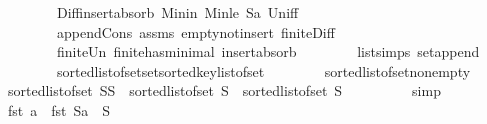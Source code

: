 \begin{isabellebody}
\ \ \ \ \ \ \ \ Diff{\isacharunderscore}{\kern0pt}insert{\isacharunderscore}{\kern0pt}absorb\ Min{\isacharunderscore}{\kern0pt}in\ Min{\isacharunderscore}{\kern0pt}le\ S{}a\ Un{\isacharunderscore}{\kern0pt}iff\isanewline
\ \ \ \ \ \ \ \ append{\isacharunderscore}{\kern0pt}Cons\ assms{\isacharparenleft}{\kern0pt}{}{\isacharparenright}{\kern0pt}\ empty{\isacharunderscore}{\kern0pt}not{\isacharunderscore}{\kern0pt}insert\ finite{\isacharunderscore}{\kern0pt}Diff\isanewline
\ \ \ \ \ \ \ \ finite{\isacharunderscore}{\kern0pt}Un\ finite{\isacharunderscore}{\kern0pt}has{\isacharunderscore}{\kern0pt}minimal\ insert{\isacharunderscore}{\kern0pt}absorb\isanewline
\ \ \ \ \ \ \ \ list{\isachardot}{\kern0pt}simps{\isacharparenleft}{\kern0pt}{}{}{\isacharparenright}{\kern0pt}\ set{\isacharunderscore}{\kern0pt}append\isanewline
\ \ \ \ \ \ \ \ sorted{\isacharunderscore}{\kern0pt}list{\isacharunderscore}{\kern0pt}of{\isacharunderscore}{\kern0pt}set{\isachardot}{\kern0pt}set{\isacharunderscore}{\kern0pt}sorted{\isacharunderscore}{\kern0pt}key{\isacharunderscore}{\kern0pt}list{\isacharunderscore}{\kern0pt}of{\isacharunderscore}{\kern0pt}set\isanewline
\ \ \ \ \ \ \ \ sorted{\isacharunderscore}{\kern0pt}list{\isacharunderscore}{\kern0pt}of{\isacharunderscore}{\kern0pt}set{\isacharunderscore}{\kern0pt}nonempty{\isacharparenright}{\kern0pt}\isanewline
\ \ \isamarkupfalse%
\ {}{}{\isacharcolon}{\kern0pt}{\isachardoublequoteopen}sorted{\isacharunderscore}{\kern0pt}list{\isacharunderscore}{\kern0pt}of{\isacharunderscore}{\kern0pt}set\ {\isacharparenleft}{\kern0pt}S{}{\isasymunion}S{}{\isacharparenright}{\kern0pt}\ {\isacharequal}{\kern0pt}\ {\isacharparenleft}{\kern0pt}sorted{\isacharunderscore}{\kern0pt}list{\isacharunderscore}{\kern0pt}of{\isacharunderscore}{\kern0pt}set\ S{}{\isacharparenright}{\kern0pt}\ {\isacharat}{\kern0pt}\ {\isacharparenleft}{\kern0pt}sorted{\isacharunderscore}{\kern0pt}list{\isacharunderscore}{\kern0pt}of{\isacharunderscore}{\kern0pt}set\ S{}{\isacharparenright}{\kern0pt}{\isachardoublequoteclose}\isanewline
\ \ \ \ \isamarkupfalse%
\ {}\ {}\ \isamarkupfalse%
\ simp\isanewline
\isanewline
\ \ \isamarkupfalse%
\ {\isachardoublequoteopen}fst\ a\ {\isasymnotin}\ {\isacharparenleft}{\kern0pt}fst\ {\isacharbackquote}{\kern0pt}{\isacharparenleft}{\kern0pt}S{}a\ {\isasymunion}\ S{}{\isacharparenright}{\kern0pt}{\isacharparenright}{\kern0pt}{\isachardoublequoteclose}\ \isamarkupfalse%

\end{isabellebody}
